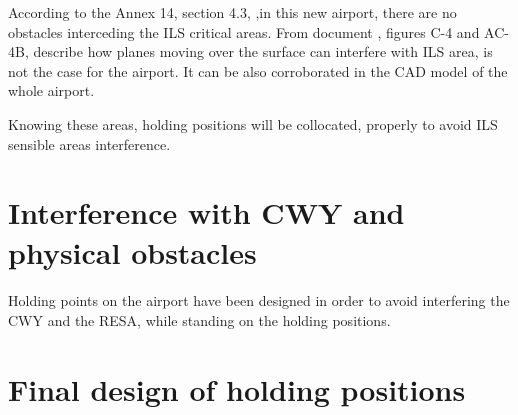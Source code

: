 	According to the Annex 14, section 4.3, \cite{Standards2016},in this new airport, there are no obstacles interceding the ILS critical areas. From document \cite{Telecomunicaciones}, figures C-4 and AC-4B, describe how planes moving over the surface can interfere with ILS area, is not the case for the airport. It can be also corroborated in the CAD model of the whole airport. 
	
	Knowing these areas, holding positions will be collocated, properly to avoid ILS sensible areas interference. 
	
	
	\section{Interference with CWY and physical obstacles}
	
	\paragraph{} Holding points on the airport have been designed in order to avoid interfering the CWY and the RESA, while standing on the holding positions.
	
	\section{Final design of holding positions}